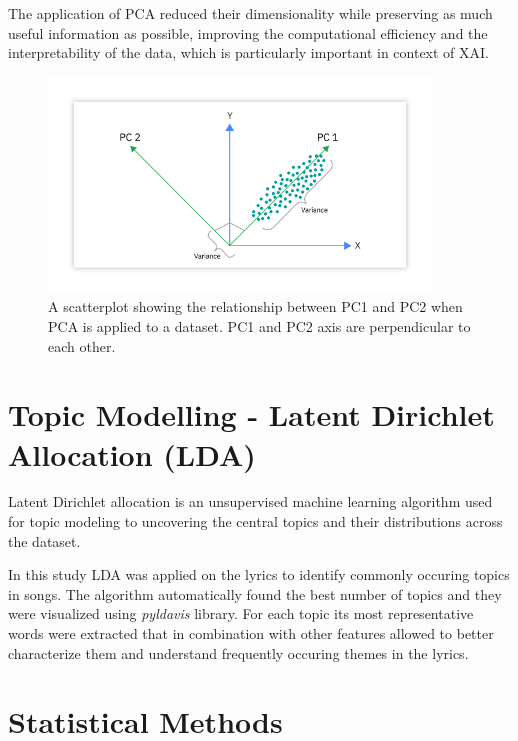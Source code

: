 The application of PCA reduced their dimensionality while preserving as much
useful information as possible, improving the computational efficiency and 
the interpretability of the data, which is particularly important in context of
XAI.

\begin{center}
\begin{figure}[H]
  \centering
  \includegraphics[width=4in]{img/pca.png}
  \caption{A scatterplot showing the relationship between PC1 and PC2 when PCA
  is applied to a dataset. PC1 and PC2 axis are perpendicular to each other.\cite{pca}}
  \label{Figure:fig_beh}
\end{figure}
\end{center}


\section{Topic Modelling - Latent Dirichlet Allocation (LDA)}
\label{sec:topicmodelling}

Latent Dirichlet allocation is an unsupervised machine learning algorithm used
for topic modeling to uncovering the central topics and their distributions
across the dataset.\cite{lda}

In this study LDA was applied on the lyrics to identify commonly occuring
topics in songs. The algorithm automatically found the best number of topics
and they were visualized using \textit{pyldavis}\cite{pylda} library. For each
topic its most representative words were extracted that in combination with
other features allowed to better characterize them and understand frequently
occuring themes in the lyrics.



\section{Statistical Methods}
\label{sec:statisticalmethods}

